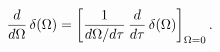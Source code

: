 \begin{equation}
{d \over d\Omega}\, \delta (\Omega)= \left[ {1 \over d\Omega/d\tau}\,
{d \over d\tau}\,\delta (\Omega) \right]_{\Omega=0}. 
\end{equation}

